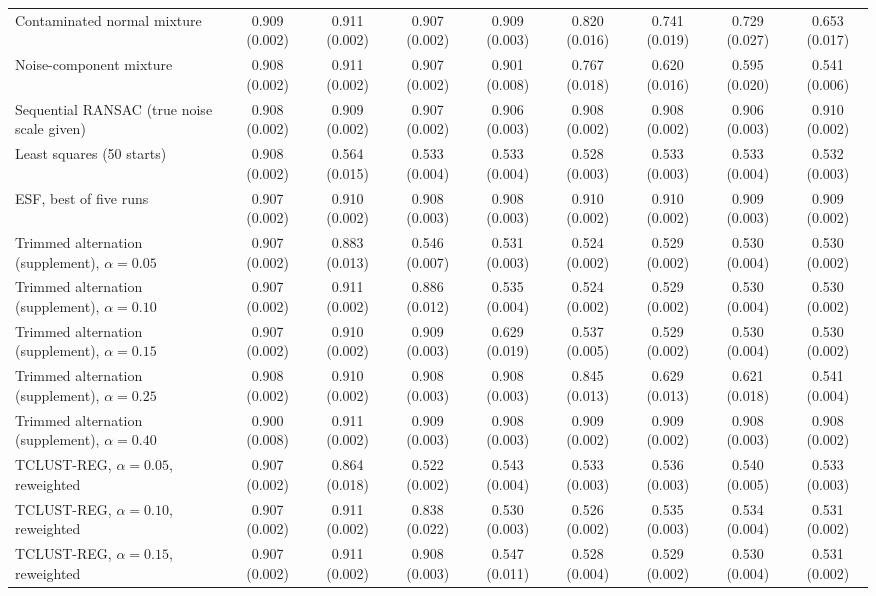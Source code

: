 \begin{table}[htbp]
{\begin{tabular}{lcccccccc}
Contaminated normal mixture & 0.909 (0.002) & 0.911 (0.002) & 0.907 (0.002) & 0.909 (0.003) & 0.820 (0.016) & 0.741 (0.019) & 0.729 (0.027) & 0.653 (0.017) \\
Noise-component mixture & 0.908 (0.002) & 0.911 (0.002) & 0.907 (0.002) & 0.901 (0.008) & 0.767 (0.018) & 0.620 (0.016) & 0.595 (0.020) & 0.541 (0.006) \\
Sequential RANSAC (true noise scale given) & 0.908 (0.002) & 0.909 (0.002) & 0.907 (0.002) & 0.906 (0.003) & 0.908 (0.002) & 0.908 (0.002) & 0.906 (0.003) & 0.910 (0.002) \\
Least squares (50 starts) & 0.908 (0.002) & 0.564 (0.015) & 0.533 (0.004) & 0.533 (0.004) & 0.528 (0.003) & 0.533 (0.003) & 0.533 (0.004) & 0.532 (0.003) \\
ESF, best of five runs & 0.907 (0.002) & 0.910 (0.002) & 0.908 (0.003) & 0.908 (0.003) & 0.910 (0.002) & 0.910 (0.002) & 0.909 (0.003) & 0.909 (0.002) \\
Trimmed alternation (supplement), $\alpha=0.05$ & 0.907 (0.002) & 0.883 (0.013) & 0.546 (0.007) & 0.531 (0.003) & 0.524 (0.002) & 0.529 (0.002) & 0.530 (0.004) & 0.530 (0.002) \\
Trimmed alternation (supplement), $\alpha=0.10$ & 0.907 (0.002) & 0.911 (0.002) & 0.886 (0.012) & 0.535 (0.004) & 0.524 (0.002) & 0.529 (0.002) & 0.530 (0.004) & 0.530 (0.002) \\
Trimmed alternation (supplement), $\alpha=0.15$ & 0.907 (0.002) & 0.910 (0.002) & 0.909 (0.003) & 0.629 (0.019) & 0.537 (0.005) & 0.529 (0.002) & 0.530 (0.004) & 0.530 (0.002) \\
Trimmed alternation (supplement), $\alpha=0.25$ & 0.908 (0.002) & 0.910 (0.002) & 0.908 (0.003) & 0.908 (0.003) & 0.845 (0.013) & 0.629 (0.013) & 0.621 (0.018) & 0.541 (0.004) \\
Trimmed alternation (supplement), $\alpha=0.40$ & 0.900 (0.008) & 0.911 (0.002) & 0.909 (0.003) & 0.908 (0.003) & 0.909 (0.002) & 0.909 (0.002) & 0.908 (0.003) & 0.908 (0.002) \\
TCLUST-REG, $\alpha=0.05$, reweighted & 0.907 (0.002) & 0.864 (0.018) & 0.522 (0.002) & 0.543 (0.004) & 0.533 (0.003) & 0.536 (0.003) & 0.540 (0.005) & 0.533 (0.003) \\
TCLUST-REG, $\alpha=0.10$, reweighted & 0.907 (0.002) & 0.911 (0.002) & 0.838 (0.022) & 0.530 (0.003) & 0.526 (0.002) & 0.535 (0.003) & 0.534 (0.004) & 0.531 (0.002) \\
TCLUST-REG, $\alpha=0.15$, reweighted & 0.907 (0.002) & 0.911 (0.002) & 0.908 (0.003) & 0.547 (0.011) & 0.528 (0.004) & 0.529 (0.002) & 0.530 (0.004) & 0.531 (0.002) \\
\bottomrule
\end{tabular}}
\end{table}

